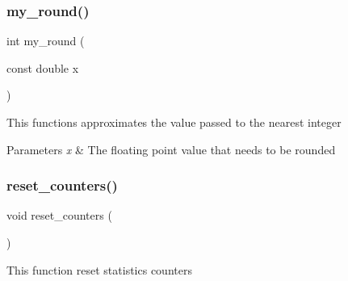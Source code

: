 \subsubsection{my\+\_\+round()}
{\footnotesize\ttfamily int my\+\_\+round (\begin{DoxyParamCaption}\item[{const double}]{x }\end{DoxyParamCaption})}

This functions approximates the value passed to the nearest integer


\begin{DoxyParams}{Parameters}
{\em x} & The floating point value that needs to be rounded \\
\hline
\end{DoxyParams}
\mbox{\label{utils_8h_a2640efff1e7b6f9c11615048ba43b0fd}} 
\subsubsection{reset\+\_\+counters()}
{\footnotesize\ttfamily void reset\+\_\+counters (\begin{DoxyParamCaption}{ }\end{DoxyParamCaption})}

This function reset statistics counters 